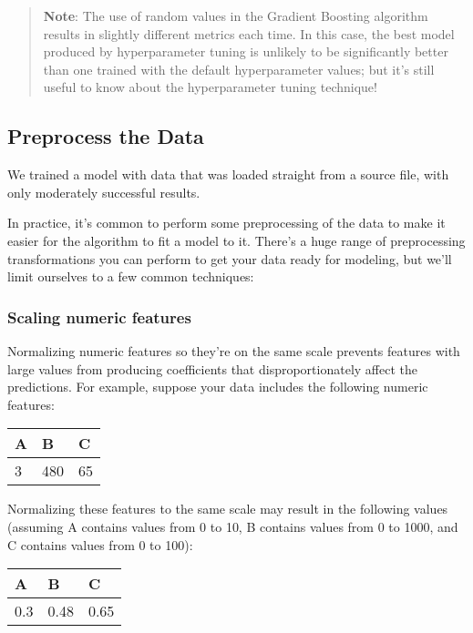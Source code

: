\documentclass[11pt]{article}
\begin{document}
    \begin{quote}
\textbf{Note}: The use of random values in the Gradient Boosting
algorithm results in slightly different metrics each time. In this case,
the best model produced by hyperparameter tuning is unlikely to be
significantly better than one trained with the default hyperparameter
values; but it's still useful to know about the hyperparameter tuning
technique!
\end{quote}

\hypertarget{preprocess-the-data}{%
\subsection{Preprocess the Data}\label{preprocess-the-data}}

We trained a model with data that was loaded straight from a source
file, with only moderately successful results.

In practice, it's common to perform some preprocessing of the data to
make it easier for the algorithm to fit a model to it. There's a huge
range of preprocessing transformations you can perform to get your data
ready for modeling, but we'll limit ourselves to a few common
techniques:

\hypertarget{scaling-numeric-features}{%
\subsubsection{Scaling numeric
features}\label{scaling-numeric-features}}

Normalizing numeric features so they're on the same scale prevents
features with large values from producing coefficients that
disproportionately affect the predictions. For example, suppose your
data includes the following numeric features:

\begin{longtable}[]{@{}lll@{}}
\toprule
A & B & C\tabularnewline
\midrule
\endhead
3 & 480 & 65\tabularnewline
\bottomrule
\end{longtable}

Normalizing these features to the same scale may result in the following
values (assuming A contains values from 0 to 10, B contains values from
0 to 1000, and C contains values from 0 to 100):

\begin{longtable}[]{@{}lll@{}}
\toprule
A & B & C\tabularnewline
\midrule
\endhead
0.3 & 0.48 & 0.65\tabularnewline
\bottomrule
\end{longtable}
\end{document}
